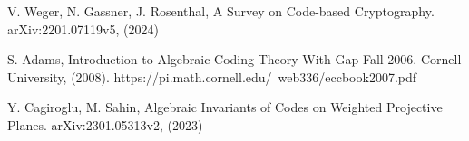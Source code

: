 \clearpage
{}
\begin{thebibliography}{20}


  V. Weger, N. Gassner, J. Rosenthal, A Survey on Code-based Cryptography. arXiv:2201.07119v5, (2024)

  S. Adams, Introduction to Algebraic Coding Theory With Gap Fall 2006. Cornell University, (2008). https://pi.math.cornell.edu/~web336/eccbook2007.pdf

  Y. Cagiroglu, M. Sahin, Algebraic Invariants of Codes on Weighted Projective Planes. arXiv:2301.05313v2, (2023)

\end{thebibliography}
